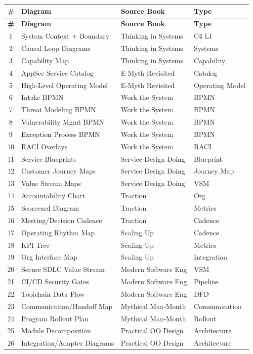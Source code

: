 \documentclass[11pt,letterpaper]{article}
\begin{document}
\begin{center}
\renewcommand{\arraystretch}{1.3}
\footnotesize
\begin{longtable}{clll}
\toprule
\textbf{\#} & \textbf{Diagram} & \textbf{Source Book} & \textbf{Type} \\
\midrule
\endfirsthead
\toprule
\textbf{\#} & \textbf{Diagram} & \textbf{Source Book} & \textbf{Type} \\
\midrule
\endhead
1 & System Context + Boundary & Thinking in Systems & C4 L1 \\
2 & Causal Loop Diagrams & Thinking in Systems & Systems \\
3 & Capability Map & Thinking in Systems & Capability \\
4 & AppSec Service Catalog & E-Myth Revisited & Catalog \\
5 & High-Level Operating Model & E-Myth Revisited & Operating Model \\
6 & Intake BPMN & Work the System & BPMN \\
7 & Threat Modeling BPMN & Work the System & BPMN \\
8 & Vulnerability Mgmt BPMN & Work the System & BPMN \\
9 & Exception Process BPMN & Work the System & BPMN \\
10 & RACI Overlays & Work the System & RACI \\
11 & Service Blueprints & Service Design Doing & Blueprint \\
12 & Customer Journey Maps & Service Design Doing & Journey Map \\
13 & Value Stream Maps & Service Design Doing & VSM \\
14 & Accountability Chart & Traction & Org \\
15 & Scorecard Diagram & Traction & Metrics \\
16 & Meeting/Decision Cadence & Traction & Cadence \\
17 & Operating Rhythm Map & Scaling Up & Cadence \\
18 & KPI Tree & Scaling Up & Metrics \\
19 & Org Interface Map & Scaling Up & Integration \\
20 & Secure SDLC Value Stream & Modern Software Eng & VSM \\
21 & CI/CD Security Gates & Modern Software Eng & Pipeline \\
22 & Toolchain Data-Flow & Modern Software Eng & DFD \\
23 & Communication/Handoff Map & Mythical Man-Month & Communication \\
24 & Program Rollout Plan & Mythical Man-Month & Rollout \\
25 & Module Decomposition & Practical OO Design & Architecture \\
26 & Integration/Adapter Diagrams & Practical OO Design & Architecture \\
\bottomrule
\end{longtable}
\end{center}
\end{document}

